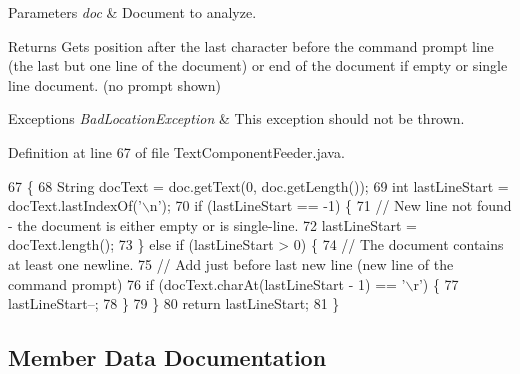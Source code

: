 \begin{DoxyParams}{Parameters}
{\em doc} & Document to analyze. \\
\hline
\end{DoxyParams}
\begin{DoxyReturn}{Returns}
Gets position after the last character before the command prompt line (the last but one line of the document) or end of the document if empty or single line document. (no prompt shown) 
\end{DoxyReturn}

\begin{DoxyExceptions}{Exceptions}
{\em Bad\+Location\+Exception} & This exception should not be thrown. \\
\hline
\end{DoxyExceptions}


Definition at line 67 of file Text\+Component\+Feeder.\+java.


\begin{DoxyCode}
67                                                                                        \{
68     String docText = doc.getText(0, doc.getLength());
69     \textcolor{keywordtype}{int} lastLineStart = docText.lastIndexOf(\textcolor{charliteral}{'\(\backslash\)n'});
70     \textcolor{keywordflow}{if} (lastLineStart == -1) \{
71       \textcolor{comment}{// New line not found - the document is either empty or is single-line.}
72       lastLineStart = docText.length();
73     \} \textcolor{keywordflow}{else} \textcolor{keywordflow}{if} (lastLineStart > 0) \{
74       \textcolor{comment}{// The document contains at least one newline.}
75       \textcolor{comment}{// Add just before last new line (new line of the command prompt)}
76       \textcolor{keywordflow}{if} (docText.charAt(lastLineStart - 1) == \textcolor{charliteral}{'\(\backslash\)r'}) \{
77         lastLineStart--;
78       \}
79     \}
80     \textcolor{keywordflow}{return} lastLineStart;
81   \}
\end{DoxyCode}


\subsection{Member Data Documentation}

